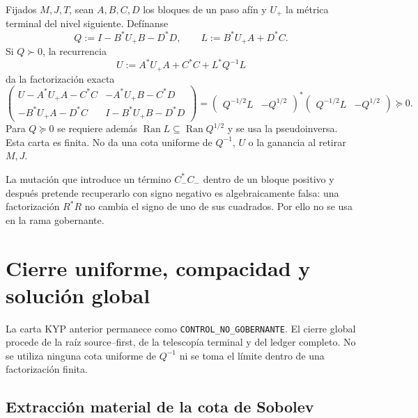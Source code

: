 Fijados $M,J,T$, sean $A,B,C,D$ los bloques de un paso afín y $U_+$ la
métrica terminal del nivel siguiente. Defínanse
\begin{equation}\label{eq:pdf2-ns-kyp-ql}
 Q:=I-B^*U_+B-D^*D,
 \qquad L:=B^*U_+A+D^*C.
\end{equation}
Si $Q\succ0$, la recurrencia
\begin{equation}\label{eq:pdf2-ns-kyp-u}
 U:=A^*U_+A+C^*C+L^*Q^{-1}L
\end{equation}
da la factorización exacta
\begin{equation}\label{eq:pdf2-ns-kyp-factor}
 \begin{pmatrix}
 U-A^*U_+A-C^*C&-A^*U_+B-C^*D\\
 -B^*U_+A-D^*C&I-B^*U_+B-D^*D
 \end{pmatrix}
 =
 \begin{pmatrix}Q^{-1/2}L&-Q^{1/2}\end{pmatrix}^{*}
 \begin{pmatrix}Q^{-1/2}L&-Q^{1/2}\end{pmatrix}\succeq0.
\end{equation}
Para $Q\succeq0$ se requiere además
$\operatorname{Ran}L\subseteq\operatorname{Ran}Q^{1/2}$ y se usa la
pseudoinversa. Esta carta es finita. No da una cota uniforme de $Q^{-1}$, $U$ o
la ganancia al retirar $M,J$.

La mutación que introduce un término $C_-^*C_-$ dentro de un bloque positivo y
después pretende recuperarlo con signo negativo es algebraicamente falsa: una
factorización $R^*R$ no cambia el signo de uno de sus cuadrados. Por ello no se usa
en la rama gobernante.

\section{Cierre uniforme, compacidad y solución global}

La carta KYP anterior permanece como \texttt{CONTROL\_NO\_GOBERNANTE}. El cierre
global procede de la raíz source--first, de la telescopía terminal y del ledger
completo. No se utiliza ninguna cota uniforme de $Q^{-1}$ ni se toma el límite dentro
de una factorización finita.

\subsection{Extracción material de la cota de Sobolev}

